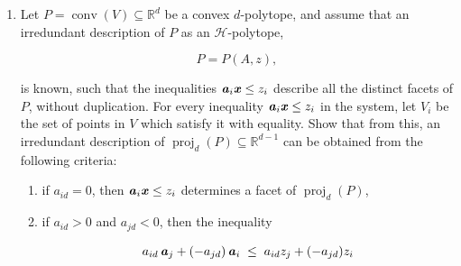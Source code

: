 \documentclass{article}
\begin{document}
\begin{enumerate}
\begin{solution}
\begin{enumerate}[label=(\roman*)]
    \item Let $V_i = V_j$. Suppose $|V_i| = d$, then $F_i = F_j$ and $\dim(F_i) = d-1$, so $H_i = H_j$ and thus the inequalities are multiples of each other. Now suppose $|V_i| < d$, then $V_i, V_j \subseteq V(F)$, the vertex set of some facet. Then both $H_i$ and $H_j$ are redundant by Exercise 2.14 part (ii).

    \item follows from (Exercise 2.15) part (ii)

    \item follows from (Exercise 2.15) part (ii)

    \item  $\rank\begin{pmatrix}
        1 & \ldots & 1 \\ v_1 & \ldots & v_d  
    \end{pmatrix} = d$ if and only if no $\bi{v} \in V$ can be written as a convex combination of the other vertices, which is really just checking that all the $\bi{v} \in V$ are real vertices. If this is satisfied, then the $d$ vertices define a $d-1$-face of $P$, which is indeed a facet. The rest simply follows by parts (iii) and (iv).
\end{enumerate}
\end{solution}

\item Let $P = \operatorname{conv}(V) \subseteq \mathbb{R}^d$ be a convex $d$-polytope, and assume that an irredundant description of $P$ as an $\mathcal{H}$-polytope,

\[ P = P(A,z), \]

is known, such that the inequalities $\textbf{\textit{a}}_i \textbf{\textit{x}} \le z_i$ describe all the distinct facets of $P$, without duplication. For every inequality $\textbf{\textit{a}}_i \textbf{\textit{x}} \le z_i$ in the system, let $V_i$ be the set of points in $V$ which satisfy it with equality. Show that from this, an irredundant description of $\operatorname{proj}_d(P) \subseteq \mathbb{R}^{d-1}$ can be obtained from the following criteria:

\begin{enumerate}[label=(\roman*)]
\item if $a_{id} = 0$, then $\textbf{\textit{a}}_i \textbf{\textit{x}} \le z_i$ determines a facet of $\operatorname{proj}_d(P)$,
\item if $a_{id} > 0$ and $a_{jd} < 0$, then the inequality

\[ a_{id}\,\textbf{\textit{a}}_j + (-a_{jd})\,\textbf{\textit{a}}_i \;\le\; a_{id} z_j + (-a_{jd}) z_i \]


\end{enumerate}
\end{enumerate}
\end{document}
